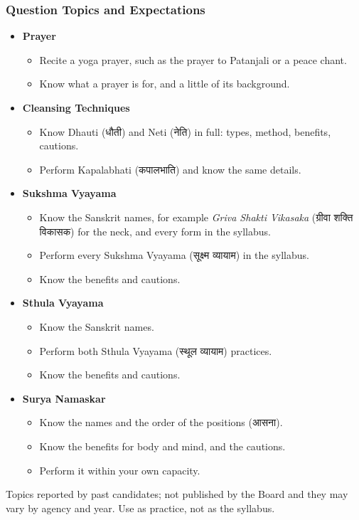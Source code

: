 \begin{frame}[fragile]\frametitle{Question Topics and Expectations}
    \begin{itemize}
        \item \textbf{Prayer}
        \begin{itemize}
            \item Recite a yoga prayer, such as the prayer to Patanjali or a peace chant.
            \item Know what a prayer is for, and a little of its background.
        \end{itemize}
        \item \textbf{Cleansing Techniques}
        \begin{itemize}
            \item Know Dhauti (धौती) and Neti (नेति) in full: types, method, benefits, cautions.
            \item Perform Kapalabhati (कपालभाति) and know the same details.
        \end{itemize}
        \item \textbf{Sukshma Vyayama}
        \begin{itemize}
            \item Know the Sanskrit names, for example \textit{Griva Shakti Vikasaka} (ग्रीवा शक्ति विकासक) for the neck, and every form in the syllabus.
            \item Perform every Sukshma Vyayama (सूक्ष्म व्यायाम) in the syllabus.
            \item Know the benefits and cautions.
        \end{itemize}
        \item \textbf{Sthula Vyayama}
        \begin{itemize}
            \item Know the Sanskrit names.
            \item Perform both Sthula Vyayama (स्थूल व्यायाम) practices.
            \item Know the benefits and cautions.
        \end{itemize}
        \item \textbf{Surya Namaskar}
        \begin{itemize}
            \item Know the names and the order of the positions (आसना).
            \item Know the benefits for body and mind, and the cautions.
            \item Perform it within your own capacity.
        \end{itemize}
    \end{itemize}
    {\tiny Topics reported by past candidates; not published by the Board and they may vary by agency and year. Use as practice, not as the syllabus.}
\end{frame}


